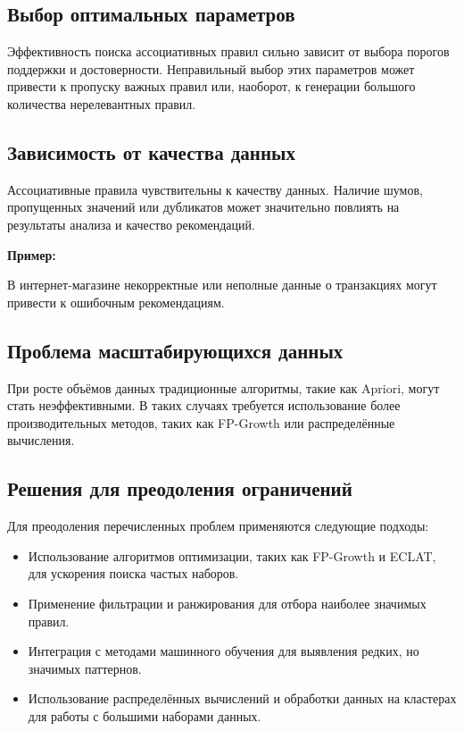 \subsection{Выбор оптимальных параметров}

Эффективность поиска ассоциативных правил сильно зависит от выбора порогов поддержки и достоверности. Неправильный выбор этих параметров может привести к пропуску важных правил или, наоборот, к генерации большого количества нерелевантных правил.

\subsection{Зависимость от качества данных}

Ассоциативные правила чувствительны к качеству данных. Наличие шумов, пропущенных значений или дубликатов может значительно повлиять на результаты анализа и качество рекомендаций.

\textbf{Пример:}

В интернет-магазине некорректные или неполные данные о транзакциях могут привести к ошибочным рекомендациям.

\subsection{Проблема масштабирующихся данных}

При росте объёмов данных традиционные алгоритмы, такие как Apriori, могут стать неэффективными. В таких случаях требуется использование более производительных методов, таких как FP-Growth или распределённые вычисления.

\subsection{Решения для преодоления ограничений}

Для преодоления перечисленных проблем применяются следующие подходы:

\begin{itemize}
    \item Использование алгоритмов оптимизации, таких как FP-Growth и ECLAT, для ускорения поиска частых наборов.
    \item Применение фильтрации и ранжирования для отбора наиболее значимых правил.
    \item Интеграция с методами машинного обучения для выявления редких, но значимых паттернов.
    \item Использование распределённых вычислений и обработки данных на кластерах для работы с большими наборами данных.
\end{itemize}

